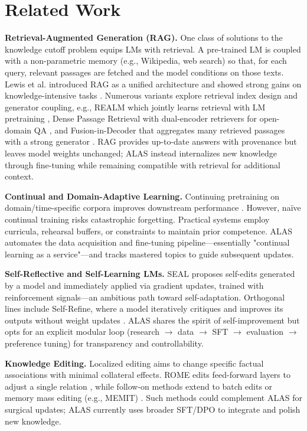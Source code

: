 \documentclass[11pt]{article}
\begin{document}
\section{Related Work}
\textbf{Retrieval-Augmented Generation (RAG).} One class of solutions to the knowledge cutoff problem equips LMs with retrieval. A pre-trained LM is coupled with a non-parametric memory (e.g., Wikipedia, web search) so that, for each query, relevant passages are fetched and the model conditions on those texts. Lewis et al. introduced RAG as a unified architecture and showed strong gains on knowledge-intensive tasks \citep{lewis2020retrieval}. Numerous variants explore retrieval index design and generator coupling, e.g., REALM which jointly learns retrieval with LM pretraining \citep{guu2020realm}, Dense Passage Retrieval with dual-encoder retrievers for open-domain QA \citep{karpukhin2020dpr}, and Fusion-in-Decoder that aggregates many retrieved passages with a strong generator \citep{izacard2021fid}. RAG provides up-to-date answers with provenance but leaves model weights unchanged; ALAS instead internalizes new knowledge through fine-tuning while remaining compatible with retrieval for additional context.

\textbf{Continual and Domain-Adaptive Learning.} Continuing pretraining on domain/time-specific corpora improves downstream performance \citep{gururangan2020dontstop}. However, naïve continual training risks catastrophic forgetting. Practical systems employ curricula, rehearsal buffers, or constraints to maintain prior competence. ALAS automates the data acquisition and fine-tuning pipeline—essentially "continual learning as a service"—and tracks mastered topics to guide subsequent updates.

\textbf{Self-Reflective and Self-Learning LMs.} SEAL \citep{seal2025} proposes self-edits generated by a model and immediately applied via gradient updates, trained with reinforcement signals—an ambitious path toward self-adaptation. Orthogonal lines include Self-Refine, where a model iteratively critiques and improves its outputs without weight updates \citep{shinn2023selfrefine}. ALAS shares the spirit of self-improvement but opts for an explicit modular loop (research $\to$ data $\to$ SFT $\to$ evaluation $\to$ preference tuning) for transparency and controllability.

\textbf{Knowledge Editing.} Localized editing aims to change specific factual associations with minimal collateral effects. ROME edits feed-forward layers to adjust a single relation \citep{meng2022rome}, while follow-on methods extend to batch edits or memory mass editing (e.g., MEMIT) \citep{meng2023memit}. Such methods could complement ALAS for surgical updates; ALAS currently uses broader SFT/DPO to integrate and polish new knowledge.
\end{document}
